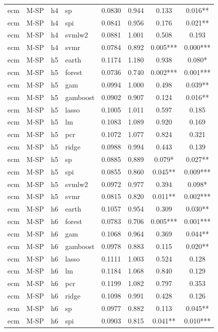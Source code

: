 \begin{ThreePartTable}
\begin{longtable}[t]{llclcccc}
ecm & M-SP & h4 & sp & 0.0830 & 0.944 & 0.133 & 0.016**\\
ecm & M-SP & h4 & spi & 0.0841 & 0.956 & 0.176 & 0.021**\\
ecm & M-SP & h4 & svmlw2 & 0.0881 & 1.001 & 0.508 & 0.193\\
ecm & M-SP & h4 & svmr & 0.0784 & 0.892 & 0.005*** & 0.000***\\
\addlinespace
ecm & M-SP & h5 & earth & 0.1174 & 1.180 & 0.938 & 0.080*\\
ecm & M-SP & h5 & forest & 0.0736 & 0.740 & 0.002*** & 0.001***\\
ecm & M-SP & h5 & gam & 0.0994 & 1.000 & 0.498 & 0.039**\\
ecm & M-SP & h5 & gamboost & 0.0902 & 0.907 & 0.124 & 0.016**\\
ecm & M-SP & h5 & lasso & 0.1005 & 1.011 & 0.597 & 0.185\\
ecm & M-SP & h5 & lm & 0.1083 & 1.089 & 0.920 & 0.169\\
ecm & M-SP & h5 & pcr & 0.1072 & 1.077 & 0.824 & 0.321\\
ecm & M-SP & h5 & ridge & 0.0988 & 0.994 & 0.443 & 0.139\\
ecm & M-SP & h5 & sp & 0.0885 & 0.889 & 0.079* & 0.027**\\
ecm & M-SP & h5 & spi & 0.0855 & 0.860 & 0.045** & 0.009***\\
ecm & M-SP & h5 & svmlw2 & 0.0972 & 0.977 & 0.394 & 0.098*\\
ecm & M-SP & h5 & svmr & 0.0815 & 0.820 & 0.011** & 0.002***\\
\addlinespace
ecm & M-SP & h6 & earth & 0.1057 & 0.954 & 0.309 & 0.030**\\
ecm & M-SP & h6 & forest & 0.0783 & 0.706 & 0.005*** & 0.001***\\
ecm & M-SP & h6 & gam & 0.1068 & 0.964 & 0.369 & 0.044**\\
ecm & M-SP & h6 & gamboost & 0.0978 & 0.883 & 0.115 & 0.020**\\
ecm & M-SP & h6 & lasso & 0.1111 & 1.003 & 0.524 & 0.128\\
ecm & M-SP & h6 & lm & 0.1184 & 1.068 & 0.840 & 0.129\\
ecm & M-SP & h6 & pcr & 0.1199 & 1.082 & 0.797 & 0.353\\
ecm & M-SP & h6 & ridge & 0.1098 & 0.991 & 0.428 & 0.126\\
ecm & M-SP & h6 & sp & 0.0977 & 0.882 & 0.113 & 0.045**\\
ecm & M-SP & h6 & spi & 0.0903 & 0.815 & 0.041** & 0.010***\\

\end{longtable}
\end{ThreePartTable}
